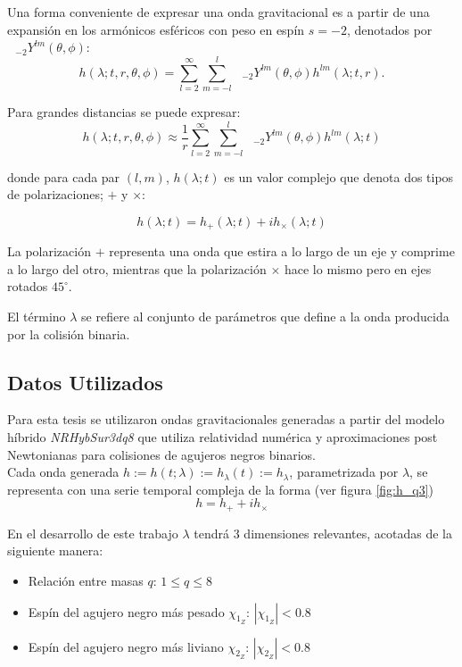 Una forma conveniente de expresar una onda gravitacional es a partir de una expansión en los armónicos esféricos con peso en espín $s=-2$, denotados por $\text{ }_{-2} Y^{lm} (\theta, \phi)$:
\begin{equation}
h( \lambda; t, r, \theta , \phi) =  \sum_{l=2}^{\infty}  \sum_{m=-l}^{l} \text{ }_{-2} Y^{lm} (\theta, \phi) h^{lm}(\lambda; t, r).
\end{equation}


Para grandes distancias se puede expresar:
\begin{equation}
h( \lambda; t, r, \theta , \phi) \approx \frac{1}{r}  \sum_{l=2}^{\infty}  \sum_{m=-l}^{l} \text{ }_{-2} Y^{lm} (\theta, \phi) h^{lm}(\lambda; t)
\end{equation}

donde para cada par $(l, m)$, $h(\lambda; t)$ es un valor complejo que denota dos tipos de polarizaciones; $+$ y $\times$:

\begin{equation}
h(\lambda; t) = h_{+}(\lambda; t) + i h_{\times}(\lambda; t)
\end{equation}

La polarización $+$ representa una onda que estira a lo largo de un eje y comprime a lo largo del otro, mientras que la polarización $\times$ hace lo mismo pero en ejes rotados $45^{\circ}$.

El término $\lambda$ se refiere al conjunto de parámetros que define a la onda producida por la colisión binaria.


\subsection*{Datos Utilizados}

Para esta tesis se utilizaron ondas gravitacionales generadas a partir del modelo híbrido \textit{NRHybSur3dq8}\cite{Varma_2019} que utiliza relatividad numérica y aproximaciones post Newtonianas para colisiones de agujeros negros binarios.
\\

Cada onda generada \( h := h(t; \lambda) := h_{\lambda}(t) := h_{\lambda} \), parametrizada por $\lambda$, se representa con una serie temporal compleja de la forma (ver figura \ref{fig:h_q3})
\[
h = h_+ + ih_{\times}
\]

En el desarrollo de este trabajo \(\lambda\) tendrá 3 dimensiones relevantes, acotadas de la siguiente manera:

\begin{itemize}
\item Relación entre masas $q$: $1 \le q \le 8$
\item Espín del agujero negro más pesado $\chi_{1_Z}$: $|\chi_{1_Z}| < 0.8$
\item Espín del agujero negro más liviano $\chi_{2_Z}$: $|\chi_{2_Z}| < 0.8$
\end{itemize}

